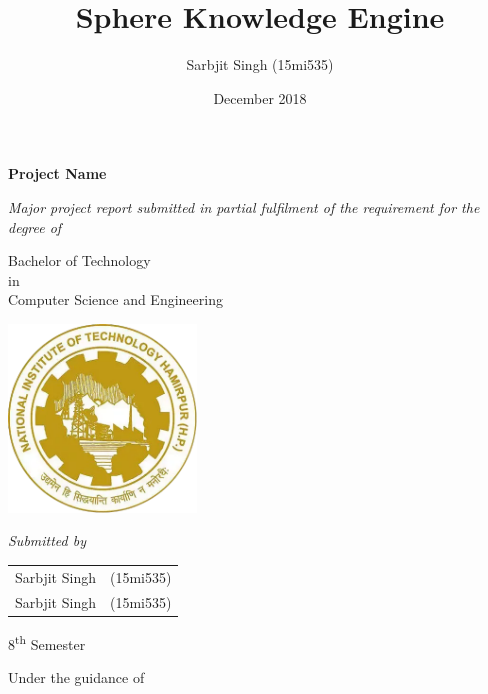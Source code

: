 \documentclass[a4paper,12 pt,oneside]{book}
\title{Sphere Knowledge Engine}
\author{Sarbjit Singh (15mi535)\\
}
\date{December 2018}
\begin{document}
\frontmatter
\pagestyle{plain}

\begin{titlepage}
    \begin{center}

        \Huge{\textbf{Project Name }}
 
        \vspace{0.5cm}
        
        \normalsize
        \textit{
        Major project report submitted in partial fulfilment of the requirement for the degree of}
        
        \vspace{10pt}
        
        Bachelor of Technology\\
        in\\
        Computer Science and Engineering
        
        \vspace{1 cm}
        \includegraphics[height=5cm]{images/nith_logo.png}
        
        \vspace{1 cm}
        \textit{Submitted by}
        
        \vspace{5pt}
        
        \begin{tabular}{c c}
            Sarbjit Singh & (15mi535)\\
            Sarbjit Singh & (15mi535)\\
        \end{tabular}
 
        \vspace{5pt}
        8\textsuperscript{th} Semester
 
        \vspace{1cm}
 
        Under the guidance of
        
        \vspace{5pt}
        

\end{center}
\end{titlepage}
\end{document}

